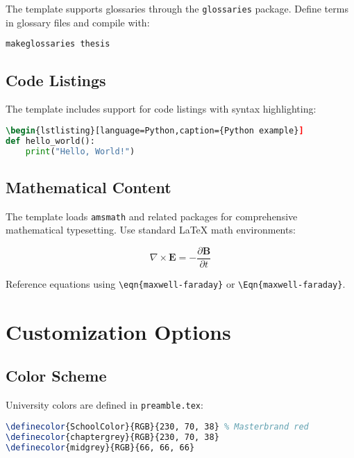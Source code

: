 The template supports glossaries through the \texttt{glossaries} package. Define terms in glossary files and compile with:

\begin{lstlisting}[language=bash]
makeglossaries thesis
\end{lstlisting}

\subsection{Code Listings}
\label{sect:code-listings}

The template includes support for code listings with syntax highlighting:

\begin{lstlisting}[language=TeX,caption={Code listing example}]
\begin{lstlisting}[language=Python,caption={Python example}]
def hello_world():
    print("Hello, World!")
\end{lstlisting}

\subsection{Mathematical Content}
\label{sect:math-content}

The template loads \texttt{amsmath} and related packages for comprehensive mathematical typesetting. Use standard LaTeX math environments:

\begin{equation}
    \nabla \times \mathbf{E} = -\frac{\partial \mathbf{B}}{\partial t}
    \label{eqn:maxwell-faraday}
\end{equation}

Reference equations using \texttt{\textbackslash eqn\{maxwell-faraday\}} or \texttt{\textbackslash Eqn\{maxwell-faraday\}}.

\section{Customization Options}
\label{sect:customization}

\subsection{Color Scheme}
\label{sect:color-scheme}

University colors are defined in \texttt{preamble.tex}:

\begin{lstlisting}[language=TeX,caption={Color definitions}]
\definecolor{SchoolColor}{RGB}{230, 70, 38} % Masterbrand red
\definecolor{chaptergrey}{RGB}{230, 70, 38}
\definecolor{midgrey}{RGB}{66, 66, 66}
\end{lstlisting}

